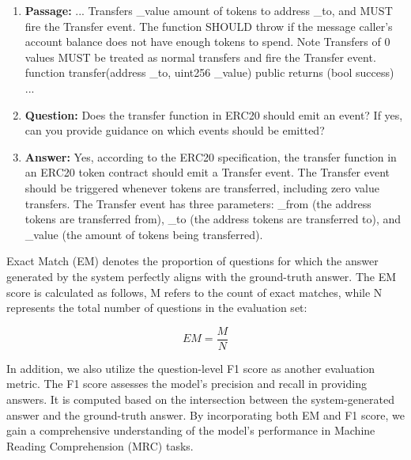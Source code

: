 \begin{enumerate}[label=(\alph*)]
    \item \label{a} \textbf{Passage:} ... 
    Transfers \_value amount of tokens to address \_to, and MUST fire the Transfer event. 
    The function SHOULD throw if the message caller's account balance does not have enough tokens to spend. 
    Note Transfers of 0 values MUST be treated as normal transfers and fire the Transfer event. 
    function transfer(address \_to, uint256 \_value) public returns (bool success) ...
    \item \label{b} \textbf{Question:} Does the transfer function in ERC20 should emit an event? If yes, can you provide guidance on which events should be emitted? 
    \item \label{c} \textbf{Answer:} Yes, according to the ERC20 specification, the transfer function in an ERC20 token contract should emit a Transfer event. 
    The Transfer event should be triggered whenever tokens are transferred, including zero value transfers. 
    The Transfer event has three parameters: \_from (the address tokens are transferred from), \_to (the address tokens are transferred to), 
    and \_value (the amount of tokens being transferred).
\end{enumerate}

Exact Match (EM) denotes the proportion of questions for which the answer generated by the system perfectly aligns with the ground-truth answer. 
The EM score is calculated as follows, M refers to the count of exact matches, while N represents the total number of questions in the evaluation set:

$$EM=\frac{M}{N}$$

In addition, we also utilize the question-level F1 score as another evaluation metric. 
The F1 score assesses the model's precision and recall in providing answers. It is computed based on the intersection between the system-generated answer and the ground-truth answer. 
By incorporating both EM and F1 score, we gain a comprehensive understanding of the model's performance in Machine Reading Comprehension (MRC) tasks. 

